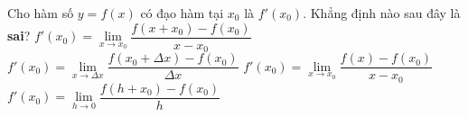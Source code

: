 \begin{ex}%
	Cho hàm số $y=f(x)$ có đạo hàm tại $x_0$ là $f'(x_0)$. Khẳng định nào sau  đây là \textbf{sai}?
	\choice 
		{\True  $f'(x_0)=\lim\limits_{x\to x_0}\dfrac{f(x+x_0)-f(x_0)}{x-x_0}$}
		{$f'(x_0)=\lim\limits_{x\to \Delta x}\dfrac{f(x_0+\Delta  x)-f(x_0)}{\Delta x}$}
		{$f'(x_0)=\lim\limits_{x\to  x_0}\dfrac{f(x)-f(x_0)}{x-x_0}$}
		{$f'(x_0)=\lim\limits_{h\to 0}\dfrac{f(h+x_0)-f(x_0)}{h}$} 
\end{ex}

